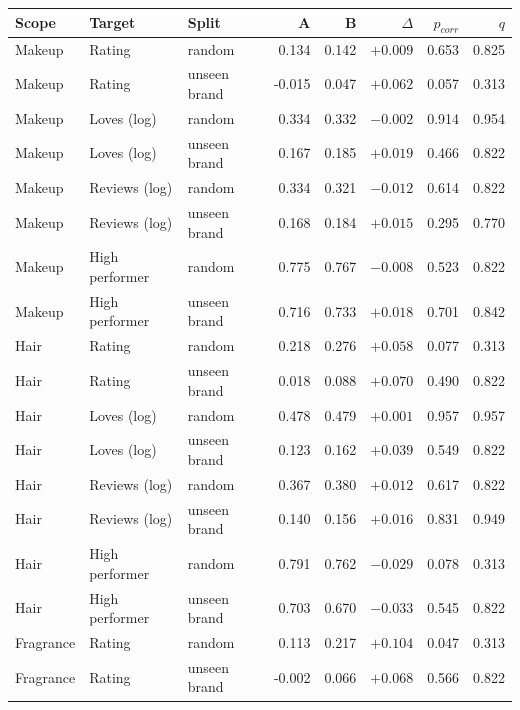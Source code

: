 \begin{table}[htbp]
\centering
\small
\begin{tabular}{|l|l|l|r|r|r|r|r|}
\hline
\rowcolor{headfill} \textbf{Scope} & \textbf{Target} & \textbf{Split} & \textbf{A} & \textbf{B} & \textbf{$\Delta$} & \textbf{$p_{corr}$} & \textbf{$q$} \\
\hline
Makeup & Rating & random & 0.134 & 0.142 & $+0.009$ & 0.653 & 0.825 \\
\hline
Makeup & Rating & unseen brand & -0.015 & 0.047 & $+0.062$ & 0.057 & 0.313 \\
\hline
Makeup & Loves (log) & random & 0.334 & 0.332 & $-0.002$ & 0.914 & 0.954 \\
\hline
Makeup & Loves (log) & unseen brand & 0.167 & 0.185 & $+0.019$ & 0.466 & 0.822 \\
\hline
Makeup & Reviews (log) & random & 0.334 & 0.321 & $-0.012$ & 0.614 & 0.822 \\
\hline
Makeup & Reviews (log) & unseen brand & 0.168 & 0.184 & $+0.015$ & 0.295 & 0.770 \\
\hline
Makeup & High performer & random & 0.775 & 0.767 & $-0.008$ & 0.523 & 0.822 \\
\hline
Makeup & High performer & unseen brand & 0.716 & 0.733 & $+0.018$ & 0.701 & 0.842 \\
\hline
\hline
Hair & Rating & random & 0.218 & 0.276 & $+0.058$ & 0.077 & 0.313 \\
\hline
Hair & Rating & unseen brand & 0.018 & 0.088 & $+0.070$ & 0.490 & 0.822 \\
\hline
Hair & Loves (log) & random & 0.478 & 0.479 & $+0.001$ & 0.957 & 0.957 \\
\hline
Hair & Loves (log) & unseen brand & 0.123 & 0.162 & $+0.039$ & 0.549 & 0.822 \\
\hline
Hair & Reviews (log) & random & 0.367 & 0.380 & $+0.012$ & 0.617 & 0.822 \\
\hline
Hair & Reviews (log) & unseen brand & 0.140 & 0.156 & $+0.016$ & 0.831 & 0.949 \\
\hline
Hair & High performer & random & 0.791 & 0.762 & $-0.029$ & 0.078 & 0.313 \\
\hline
Hair & High performer & unseen brand & 0.703 & 0.670 & $-0.033$ & 0.545 & 0.822 \\
\hline
\hline
Fragrance & Rating & random & 0.113 & 0.217 & $+0.104$ & 0.047 & 0.313 \\
\hline
Fragrance & Rating & unseen brand & -0.002 & 0.066 & $+0.068$ & 0.566 & 0.822 \\

\end{tabular}
\end{table}
